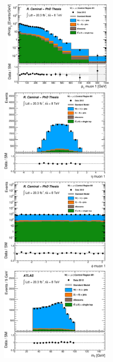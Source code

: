 \begin{figure}[!ht]
  \begin{center}
    \mbox{
      \includegraphics[width=0.495\textwidth]{MonojetAnalysis/Figures/plot_Stop_A6_CRwmn_m_pt_fitted.eps}
      \includegraphics[width=0.495\textwidth]{MonojetAnalysis/Figures/plot_Stop_A6_CRwmn_m_eta_fitted.eps}
    }
    \mbox{
      \includegraphics[width=0.495\textwidth]{MonojetAnalysis/Figures/plot_Stop_A6_CRwmn_m_phi_fitted.eps}
      \includegraphics[width=0.495\textwidth]{MonojetAnalysis/Figures/plot_Stop_A6_CRwmn_m_MT_fitted.eps}
}
\end{center}
\end{figure}
